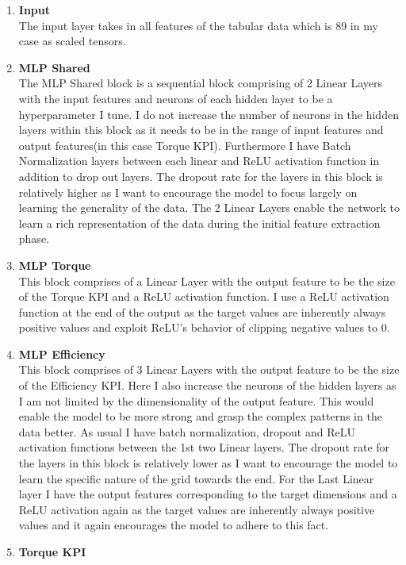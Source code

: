 \documentclass{report} %
\begin{document}
\begin{enumerate}
    \item \textbf{Input} \\
    The input layer takes in all features of the tabular data which is 89 in my case as scaled tensors.
    \item \textbf{MLP Shared} \\
    The MLP Shared block is a sequential block comprising of 2 Linear Layers with the input features and neurons of each hidden layer to be a hyperparameter I tune.
    I do not increase the number of neurons in the hidden layers within this block as it needs to be in the range of input features and output features(in this case Torque \ac{KPI}).
    Furthermore I have Batch Normalization layers between each linear and \ac{ReLU} activation function in addition to drop out layers.
    The dropout rate for the layers in this block is relatively higher as I want to encourage the model to focus largely on learning the generality of the data.
    The 2 Linear Layers enable the network to learn a rich representation of the data during the initial feature extraction phase.
    \item \textbf{MLP Torque} \\
    This block comprises of a Linear Layer with the output feature to be the size of the Torque \ac{KPI} and a \ac{ReLU} activation function.
    I use a \ac{ReLU} activation function at the end of the output as the target values are inherently always positive values and exploit \ac{ReLU}'s behavior of clipping negative values to 0.
    \item \textbf{MLP Efficiency} \\
    This block comprises of 3 Linear Layers with the output feature to be the size of the Efficiency \ac{KPI}.
    Here I also increase the neurons of the hidden layers as I am not limited by the dimensionality of the output feature.
    This would enable the model to be more strong and grasp the complex patterns in the data better.
    As usual I have batch normalization, dropout and \ac{ReLU} activation functions between the 1st two Linear layers.
    The dropout rate for the layers in this block is relatively lower as I want to encourage the model to learn the specific nature of the grid towards the end.
    For the Last Linear layer I have the output features corresponding to the target dimensions and a \ac{ReLU} activation again as the target values are inherently 
    always positive values and it again encourages the model to adhere to this fact.
    \item \textbf{Torque \ac{KPI}} \\

\end{enumerate}
\end{document}
